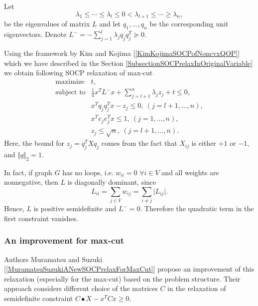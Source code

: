 \documentclass[12pt]{book}
\theoremstyle{definition}
\begin{document}
Let $$\lambda_1\leq \cdots \leq \lambda_l \leq  0 < \lambda_{l+1} \leq \cdots \geq \lambda_n, $$
be the eigenvalues of matrix $L$ and let $q_1,\dots , q_n$ be the corresponding unit eigenvectors. Denote $L^- = -\sum_{j = 1}^{l}\lambda_j q_jq_j^T\succeq 0$.


Using the framework by Kim and Kojima [\ref{KimKojimaSOCPofNoncvxQOP}] which we have described in the Section \ref{SubsectionSOCPrelaxInOriginalVariable} we obtain following SOCP relaxation of max-cut
\begin{equation}
\begin{array}{ll}
\label{MaxCutSOCPRelax1}
\mbox{maximize} & t, \\
\mbox{subject to} & \frac{1}{4}x^TL^-x + \sum_{j=l+1}^n\lambda_jz_j + t \leq 0 , \\
&	x^Tq_jq_j^Tx - z_j \leq 0, \ (j = l+1,\dots ,n), \\
&  	x^Te_je_j^Tx \leq 1, \ (j = 1,\dots ,n), \\
& z_j \leq \sqrt{n}, \ (j = l+1,\dots ,n).
\end{array}
\end{equation}
Here, the bound for $z_j = q^T_jXq_j$ comes from the fact that $X_{ij}$ is either $+1$ or $-1,$ and $\Vert q \Vert_2 = 1.$

In fact, if graph $G$ has no loops, i.e. $w_{ii} = 0$ $\forall i\in V$ and all weights are nonnegative, then $L$ is diagonally dominant, since
$$L_{ii} = \sum_{j\in V} w_{ij} = \sum_{i\neq j} \vert L_{ij} \vert. $$
Hence, $L$ is positive semidefinite and $L^-=0.$ Therefore the quadratic term in the first constraint vanishes.



\subsubsection{An improvement for max-cut}
Authors Muramatsu and Suzuki [\ref{MuramatsuSuzukiANewSOCPrelaxForMaxCut}]
propose an improvement of this relaxation (especially for the max-cut) based on the problem structure. Their approach considers different choice of the matrices $C$ in the relaxation of semidefinite constraint $C\bullet X - x^TCx \geq 0$.
\end{document}
